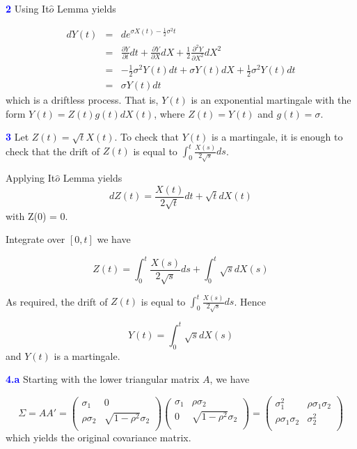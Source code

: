 \documentclass[a4paper,11pt] {article}
\begin{document}
\textcolor{blue}{\bf 2} Using It$\hat{o}$ Lemma yields

\begin{eqnarray*}
dY(t) &=& de^{\sigma X(t) - \frac{1}{2}\sigma^2 t} \\
      &=& \frac{\partial Y}{\partial t} dt + \frac{\partial Y}{\partial X} dX + \frac{1}{2} \frac{\partial^2 Y}{\partial X^2} dX^2 \\
      &=& -\frac{1}{2}\sigma^2 Y(t)dt + \sigma Y(t)dX + \frac{1}{2} \sigma^2 Y(t) dt \\
      &=& \sigma Y(t) dt
\end{eqnarray*}
which is a driftless process. That is, $Y(t)$ is an exponential martingale with the form $Y(t)=Z(t)g(t)dX(t)$, where $Z(t) = Y(t)$ and $g(t) = \sigma$.

\textcolor{blue}{\bf 3 } Let $Z(t)=\sqrt{t}X(t)$. To check that $Y(t)$ is a martingale, it is enough to check that the drift of $Z(t)$ is equal to $\int_0^t \frac{X(s)}{2\sqrt{s}}ds$.

Applying It$\hat{o}$ Lemma yields
$$
dZ(t) = \frac{X(t)}{2\sqrt{t}}dt + \sqrt{t}dX(t)
$$
with Z(0) = 0.

Integrate over $[0,t]$ we have

$$
Z(t) = \int_0^t \frac{X(s)}{2\sqrt{s}}ds + \int_0^t \sqrt{s}dX(s)
$$

As required, the drift of $Z(t)$ is equal to $\int_0^t \frac{X(s)}{2\sqrt{s}}ds$. Hence

$$
Y(t) = \int_0^t \sqrt{s}dX(s)
$$
and $Y(t)$ is a martingale.

\textcolor{blue}{\bf 4.a } Starting with the lower triangular matrix $A$, we have

$$
\Sigma = AA' =
\left(
  \begin{array}{cc}
    \sigma_1 & 0 \\
    \rho \sigma_2 & \sqrt{1-\rho^2}\sigma_2 \\
  \end{array}
\right)
\left(
  \begin{array}{cc}
    \sigma_1 & \rho \sigma_2 \\
    0 & \sqrt{1-\rho^2}\sigma_2 \\
  \end{array}
\right)
=
\left(
  \begin{array}{cc}
    \sigma_1^2 & \rho \sigma_1 \sigma_2 \\
    \rho \sigma_1 \sigma_2 & \sigma_2^2 \\
  \end{array}
\right)
$$
which yields the original covariance matrix.
\end{document}
